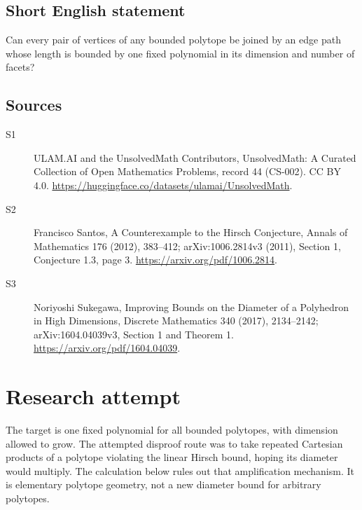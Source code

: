\documentclass[11pt]{article}
\begin{document}
\subsection{Short English statement}
Can every pair of vertices of any bounded polytope be joined by an edge path whose length is bounded by one fixed polynomial in its dimension and number of facets?
\subsection{Sources}
\begin{description}
\item[S1] ULAM.AI and the UnsolvedMath Contributors, UnsolvedMath: A Curated Collection of Open Mathematics Problems, record 44 (CS-002). CC BY 4.0. \url{https://huggingface.co/datasets/ulamai/UnsolvedMath}.
\item[S2] Francisco Santos, A Counterexample to the Hirsch Conjecture, Annals of Mathematics 176 (2012), 383--412; arXiv:1006.2814v3 (2011), Section 1, Conjecture 1.3, page 3. \url{https://arxiv.org/pdf/1006.2814}.
\item[S3] Noriyoshi Sukegawa, Improving Bounds on the Diameter of a Polyhedron in High Dimensions, Discrete Mathematics 340 (2017), 2134--2142; arXiv:1604.04039v3, Section 1 and Theorem 1. \url{https://arxiv.org/pdf/1604.04039}.
\end{description}
\label{end:44}


\section{Research attempt}
The target is one fixed polynomial for all bounded polytopes, with dimension allowed to grow. The attempted disproof route was to take repeated Cartesian products of a polytope violating the linear Hirsch bound, hoping its diameter would multiply. The calculation below rules out that amplification mechanism. It is elementary polytope geometry, not a new diameter bound for arbitrary polytopes.
\end{document}
